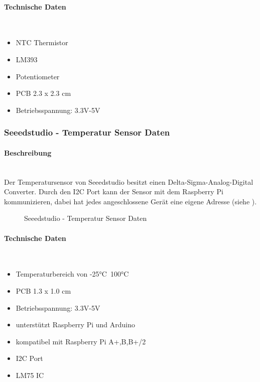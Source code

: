 \paragraph{Technische Daten}\mbox{}\\
\begin{itemize}
\item NTC Thermistor
\item LM393
\item Potentiometer
\item PCB 2.3 x 2.3 cm
\item Betriebsspannung: 3.3V-5V
\end{itemize}

\subsubsection{Seeedstudio - Temperatur Sensor Daten}
\paragraph{Beschreibung}\mbox{}\\
Der Temperatursensor von Seeedstudio besitzt einen Delta-Sigma-Analog-Digital Converter. Durch den I2C Port kann der Sensor mit dem Raspberry Pi kommunizieren, dabei hat jedes angeschlossene Gerät eine eigene Adresse (siehe ).

\begin{figure}[H]
\centering
{}
\caption{Seeedstudio - Temperatur Sensor Daten}
\label{fig:sensors2}
\end{figure}

\paragraph{Technische Daten}\mbox{}\\
\begin{itemize}
\item Temperaturbereich von -25°C~100°C
\item PCB 1.3 x 1.0 cm
\item Betriebsspannung: 3.3V-5V
\item unterstützt Raspberry Pi und Arduino
\item kompatibel mit Raspberry Pi A+,B,B+/2
\item I2C Port
\item LM75 IC
\end{itemize}

